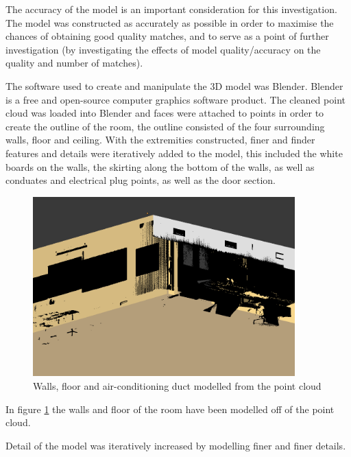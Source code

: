 \documentclass[11pt,a4paper]{report}
\begin{document}
				The accuracy of the model is an important consideration for this investigation. The model was constructed as accurately as possible in order to maximise the chances of obtaining good quality matches, and to serve as a point of further investigation (by investigating the effects of model quality/accuracy on the quality and number of matches).
				
				The software used to create and manipulate the 3D model was Blender. Blender is a free and open-source computer graphics software product. The cleaned point cloud was loaded into Blender and faces were attached to points in order to create the outline of the room, the outline consisted of the four surrounding walls, floor and ceiling. With the extremities constructed, finer and finder features and details were iteratively added to the model, this included the white boards on the walls, the skirting along the bottom of the walls, as well as conduates and electrical plug points, as well as the door section.
				
				\begin{figure}[H]
					\centering
					\includegraphics[width=0.9\textwidth]{simple_model_with_pc}
					\caption{Walls, floor and air-conditioning duct modelled from the point cloud}
					\label{fig:simple_model}
				\end{figure}
				
				In figure \ref{fig:simple_model} the walls and floor of the room have been modelled off of the point cloud. 
				
				Detail of the model was iteratively increased by modelling finer and finer details.
				
\end{document}
